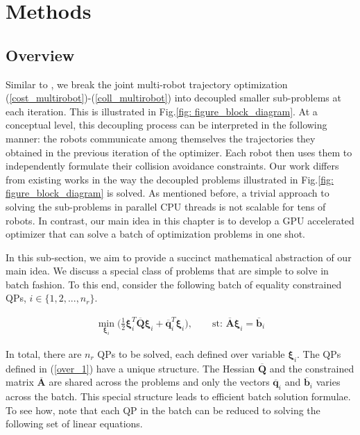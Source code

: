 



\section{Methods}
\subsection{Overview} \label{batch_QP_setup}
\noindent Similar to \citep{alonso_mora_nips_multi}, we break the joint multi-robot trajectory optimization (\ref{cost_multirobot})-(\ref{coll_multirobot}) into decoupled smaller sub-problems at each iteration. This is illustrated in Fig.\ref{fig: figure_block_diagram}. At a conceptual level, this decoupling process can be interpreted in the following manner: the robots communicate among themselves the trajectories they obtained in the previous iteration of the optimizer. Each robot then uses them to independently formulate their collision avoidance constraints. Our work differs from existing works in the way the decoupled problems illustrated in Fig.\ref{fig: figure_block_diagram} is solved. As mentioned before, a trivial approach to solving the sub-problems in parallel CPU threads is not scalable for tens of robots. In contrast, our main idea in this chapter is to develop a GPU accelerated optimizer that can solve a batch of optimization problems in one shot. 

In this sub-section, we aim to provide a succinct mathematical abstraction of our main idea. We discuss a special class of problems that are simple to solve in batch fashion. To this end, consider the following batch of equality constrained QPs, $ i\in \{1,2,...,n_r\}$.

\begin{align}
\min_{\boldsymbol{\xi}_{i}} \Big(\frac{1}{2}\boldsymbol{\xi}^{T}_{i}\overline{\textbf{Q}}\boldsymbol{\xi}_{i} + \overline{\textbf{q}}^{T}_{i}\boldsymbol{\xi}_{i}\Big), \qquad
 \text{st: } \overline{\textbf{A}} \boldsymbol{\xi}_{i} = \overline{\textbf{b}}_{i} \label{over_1}
\end{align}

\noindent In total, there are $n_r$ QPs to be solved, each defined over variable $\boldsymbol{\xi}_i$. The QPs defined in (\ref{over_1}) have a unique structure. The Hessian $\overline{\textbf{Q}}$ and the constrained matrix $\overline{\textbf{A}}$ are shared across the problems and only the vectors $\overline{\textbf{q}}_i$ and $\overline{\textbf{b}}_i$ varies across the batch. This special structure leads to efficient batch solution formulae. To see how, note that each QP in the batch can be reduced to solving the following set of linear equations.


